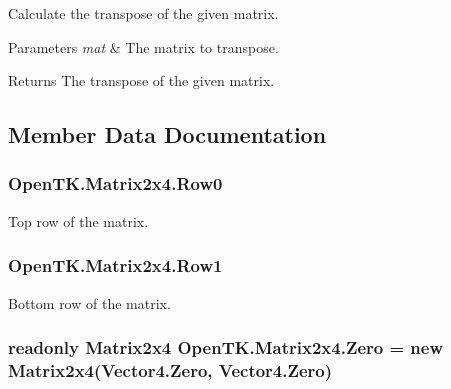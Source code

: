 Calculate the transpose of the given matrix. 


\begin{DoxyParams}{Parameters}
{\em mat} & The matrix to transpose.\\
\hline
\end{DoxyParams}
\begin{DoxyReturn}{Returns}
The transpose of the given matrix.
\end{DoxyReturn}


\subsection{Member Data Documentation}
\hypertarget{struct_open_t_k_1_1_matrix2x4_a6f9f177d5fa9e63724c46348b5045bb5}{
\subsubsection[{Row0}]{ Open\-T\-K.\-Matrix2x4.\-Row0}}\label{struct_open_t_k_1_1_matrix2x4_a6f9f177d5fa9e63724c46348b5045bb5}


Top row of the matrix. 

\hypertarget{struct_open_t_k_1_1_matrix2x4_a666e2381cfc56f373d3fe2d9093a8443}{
\subsubsection[{Row1}]{ Open\-T\-K.\-Matrix2x4.\-Row1}}\label{struct_open_t_k_1_1_matrix2x4_a666e2381cfc56f373d3fe2d9093a8443}


Bottom row of the matrix. 

\hypertarget{struct_open_t_k_1_1_matrix2x4_aaf9cf3de1c8358e46f5839dca3dc555d}{
\subsubsection[{Zero}]{\setlength{\rightskip}{0pt plus 5cm}readonly {\bf Matrix2x4} Open\-T\-K.\-Matrix2x4.\-Zero = new {\bf Matrix2x4}(Vector4.\-Zero, Vector4.\-Zero)\hspace{0.3cm}{\ttfamily [static]}}}\label{struct_open_t_k_1_1_matrix2x4_aaf9cf3de1c8358e46f5839dca3dc555d}


